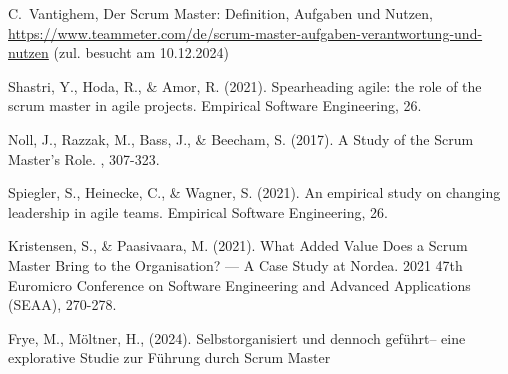 \documentclass[5pt, final]{beamer}
\begin{document}
\begin{frame}[t]
\begin{multicols}{3}
\begin{thebibliography}{99}
				 C.~Vantighem, Der Scrum Master: Definition, Aufgaben und Nutzen, \url{https://www.teammeter.com/de/scrum-master-aufgaben-verantwortung-und-nutzen} (zul. besucht am 10.12.2024)
				
				 Shastri, Y., Hoda, R., & Amor, R. (2021). Spearheading agile: the role of the scrum master in agile projects. Empirical Software Engineering, 26.
				
				 Noll, J., Razzak, M., Bass, J., & Beecham, S. (2017). A Study of the Scrum Master's Role. , 307-323. 
				
				 Spiegler, S., Heinecke, C., & Wagner, S. (2021). An empirical study on changing leadership in agile teams. Empirical Software Engineering, 26.
				
				 Kristensen, S., & Paasivaara, M. (2021). What Added Value Does a Scrum Master Bring to the Organisation? — A Case Study at Nordea. 2021 47th Euromicro Conference on Software Engineering and Advanced Applications (SEAA), 270-278.
				
				 Frye, M., Möltner, H., (2024). Selbstorganisiert und dennoch geführt– eine explorative Studie zur Führung durch Scrum Master
				
				
			\end{thebibliography}
			
		\end{multicols}
		
	\end{frame}
\end{document}
